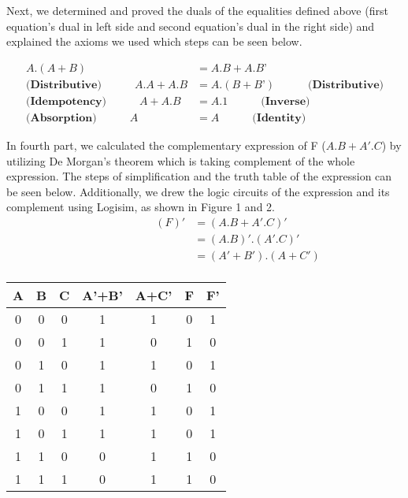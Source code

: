 \documentclass[pdftex,12pt,a4paper]{article}
\begin{document}
Next, we determined and proved the duals of the equalities defined above (first equation's dual in left side and second equation's dual in the right side) and explained the axioms we used which steps can be seen below.

\begin{align*}
A.(A + B) &= A.B + A.B’  \\
\textbf{(Distributive)} \qquad\quad A.A + A.B &= A.(B + B’) \qquad\quad \textbf{(Distributive)} \\
\textbf{(Idempotency)}\qquad\quad A + A.B &= A.1 \qquad\quad \textbf{(Inverse)} \\
\textbf{(Absorption)} \qquad\quad A &= A \qquad\quad \textbf{(Identity)}
\end{align*}

In fourth part, we calculated the complementary expression of F (\(A.B + A'.C\)) by utilizing De Morgan's theorem which is taking complement of the whole expression. The steps of simplification and the truth table of the expression can be seen below. Additionally, we drew the logic circuits of the expression and its complement using Logisim, as shown in Figure 1 and 2.
\begin{align*}
\qquad\qquad\qquad (F)' &=  (A.B + A'.C)' \\
     \qquad\qquad&= (A.B)'.(A'.C)' \\
     \qquad\qquad&= (A'+B').(A+C') \\
\end{align*}

\newpage

\begin{center}
 \begin{tabular}{|c|c|c|c|c|c|c|} 
 \hline
 A & B & C & A'+B' & A+C' & F & F'  \\ 
 \hline\hline
 0 & 0 & 0 & 1 & 1 & 0 & 1 \\ 
 \hline
 0 & 0 & 1 & 1 & 0 & 1 & 0 \\
 \hline
 0 & 1 & 0 & 1 & 1 & 0 & 1 \\
 \hline
 0 & 1 & 1 & 1 & 0 & 1 & 0 \\
 \hline
 1 & 0 & 0 & 1 & 1 & 0 & 1 \\ 
 \hline
 1 & 0 & 1 & 1 & 1 & 0 & 1 \\ 
 \hline
 1 & 1 & 0 & 0 & 1 & 1 & 0 \\ 
 \hline
 1 & 1 & 1 & 0 & 1 & 1 & 0 \\ 
 \hline
\end{tabular}
\end{center}
\end{document}
